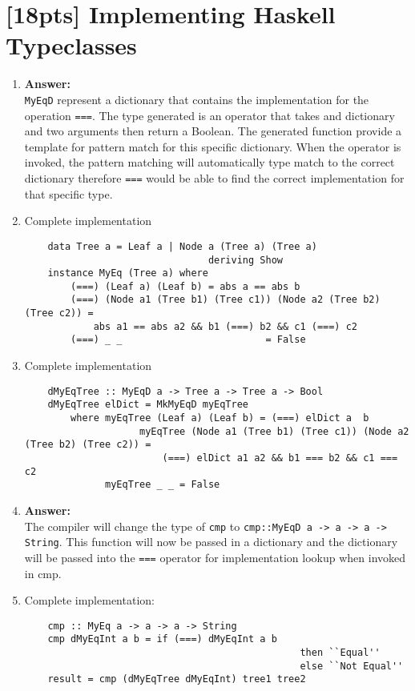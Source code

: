 \documentclass{article}
\begin{document}
\section{[18pts] Implementing Haskell Typeclasses}
\begin{enumerate}
	\item \textbf{Answer: }\\
	\texttt{MyEqD} represent a dictionary that contains the implementation for the
	operation \texttt{===}. The type generated is an operator that takes and
	dictionary and two arguments then return a Boolean. The generated function
	provide a template for pattern match for this specific dictionary. When the
	operator is invoked, the pattern matching will automatically type match to the
	correct dictionary therefore \texttt{===} would be able to find the correct
	implementation for that specific type.

	\item Complete implementation
		\begin{lstlisting}
	data Tree a = Leaf a | Node a (Tree a) (Tree a)
								deriving Show
	instance MyEq (Tree a) where
		(===) (Leaf a) (Leaf b) = abs a == abs b
		(===) (Node a1 (Tree b1) (Tree c1)) (Node a2 (Tree b2) (Tree c2)) =
			abs a1 == abs a2 && b1 (===) b2 && c1 (===) c2
		(===) _ _ 						  = False
		\end{lstlisting}

	\item Complete implementation
		\begin{lstlisting}
	dMyEqTree :: MyEqD a -> Tree a -> Tree a -> Bool
	dMyEqTree elDict = MkMyEqD myEqTree
		where myEqTree (Leaf a) (Leaf b) = (===) elDict a  b
		 			myEqTree (Node a1 (Tree b1) (Tree c1)) (Node a2 (Tree b2) (Tree c2)) =
						(===) elDict a1 a2 && b1 === b2 && c1 === c2
		      myEqTree _ _ = False
		\end{lstlisting}

	\item \textbf{Answer: }\\
		The compiler will change the type of \texttt{cmp} to \texttt{cmp::MyEqD a
		-> a -> a -> String}. This function will now be passed in a dictionary and
		the dictionary will be passed into the \texttt{===} operator for
		implementation lookup when invoked in cmp.

	\item Complete implementation: \\
		\begin{lstlisting}
	cmp :: MyEq a -> a -> a -> String
	cmp dMyEqInt a b = if (===) dMyEqInt a b
												then ``Equal''
												else ``Not Equal''
	result = cmp (dMyEqTree dMyEqInt) tree1 tree2
		\end{lstlisting}
\end{enumerate}
\end{document}
